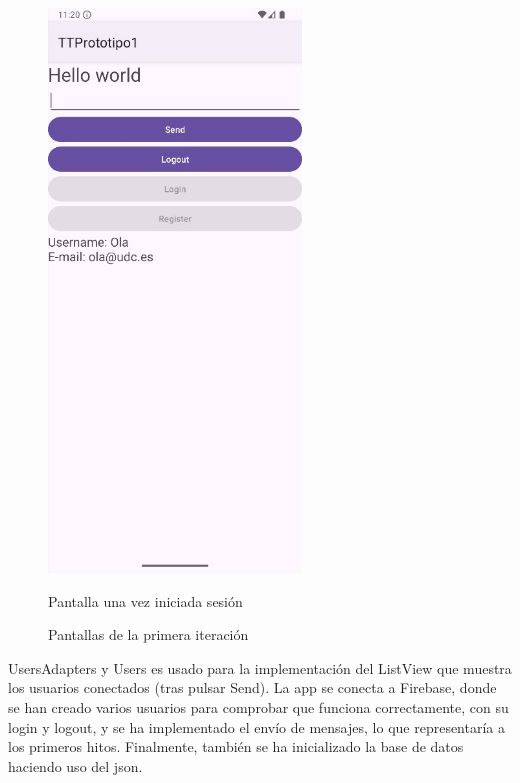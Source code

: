 \documentclass[a4paper,openright,12pt]{article}
\begin{document}
\begin{figure}[htp]
\begin{minipage}{0.3\textwidth}
        \includegraphics[width=0.6\textwidth]{Images/Vista_It1_2.jpg} 
        \caption{Pantalla una vez iniciada sesión}
        \label{fig:Pantalla una vez iniciada sesión}
    \end{minipage}
    \caption{Pantallas de la primera iteración}
    \label{fig:primera iteración}
\end{figure}

UsersAdapters y Users es usado para la implementación del ListView que muestra los usuarios conectados (tras pulsar Send). La app se conecta a Firebase, donde se han creado varios usuarios para comprobar que funciona correctamente, con su login y logout, y se ha implementado el envío de mensajes, lo que representaría a los primeros hitos.
Finalmente, también se ha inicializado la base de datos haciendo uso del json.
\end{document}
